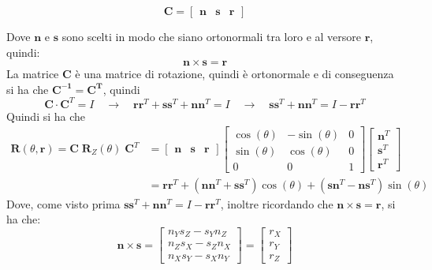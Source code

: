 \documentclass[11pt, a4paper]{report}
\begin{document}
\[
    \mathbf{C} =
    \begin{bmatrix}
        \mathbf{n} & \mathbf{s} & \mathbf{r}
    \end{bmatrix}
\]

Dove \(\mathbf{n}\) e \(\mathbf{s}\) sono scelti in modo che siano ortonormali tra loro e al versore \(\mathbf{r}\), quindi:
\[
    \mathbf{n} \times \mathbf{s} = \mathbf{r}
\]
La matrice \(\mathbf{C}\) è una matrice di rotazione, quindi è ortonormale e di conseguenza si ha che \(\mathbf{C^{-1}} = \mathbf{C^{T}}\), quindi
\[
    \mathbf{C} \cdot \mathbf{C}^{T} = I \quad\longrightarrow\quad
    \mathbf{r}\mathbf{r}^{T} + \mathbf{s}\mathbf{s}^{T} + \mathbf{n}\mathbf{n}^{T} = I \quad\longrightarrow\quad
    \mathbf{s}\mathbf{s}^{T} + \mathbf{n}\mathbf{n}^{T} = I - \mathbf{r}\mathbf{r}^{T}
\]
Quindi si ha che
\begin{align*}
    \mathbf{R}(\theta, \mathbf{r}) = \mathbf{C} \; \mathbf{R}_Z(\theta) \; \mathbf{C}^{T} &=
    \begin{bmatrix}
        \mathbf{n} & \mathbf{s} & \mathbf{r}
    \end{bmatrix}
    \begin{bmatrix}
       \cos(\theta) & -\sin(\theta) & 0 \\
       \sin(\theta) &  \cos(\theta) & 0 \\
       0 & 0 & 1
    \end{bmatrix}
    \begin{bmatrix}
        \mathbf{n}^{T}\\
        \mathbf{s}^{T}\\
        \mathbf{r}^{T}
    \end{bmatrix}\\
    &= \mathbf{r}\mathbf{r}^{T} + (\mathbf{n}\mathbf{n}^{T} + \mathbf{s}\mathbf{s}^{T})\cos(\theta) + (\mathbf{s}\mathbf{n}^{T} - \mathbf{n}\mathbf{s}^{T})\sin(\theta)
\end{align*}
Dove, come visto prima $\mathbf{s}\mathbf{s}^{T} + \mathbf{n}\mathbf{n}^{T} = I - \mathbf{r}\mathbf{r}^{T}$, inoltre ricordando che  \(\mathbf{n} \times \mathbf{s} = \mathbf{r}\), si ha che:
\[
\mathbf{n} \times \mathbf{s} =
\begin{bmatrix}
    n_{Y} s_{Z} - s_{Y} n_{Z}\\
    n_{Z} s_{X} - s_{Z} n_{X}\\
    n_{X} s_{Y} - s_{X} n_{Y}
\end{bmatrix}
=
\begin{bmatrix}
    r_{X}\\
    r_{Y}\\
    r_{Z}
\end{bmatrix}
\]
\end{document}
